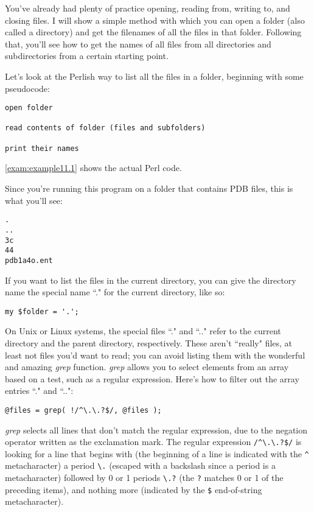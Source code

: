 You've already had plenty of practice opening, reading from, writing to, and closing files. I will show a simple method with which you can open a folder (also called a directory) and get the filenames of all the files in that folder. Following that, you'll see how to get the names of all files from all directories and subdirectories from a certain starting point.

Let's look at the Perlish way to list all the files in a folder, beginning with some pseudocode: 

\begin{lstlisting}
open folder

read contents of folder (files and subfolders)

print their names
\end{lstlisting}

\autoref{exam:example11.1} shows the actual Perl code.



Since you're running this program on a folder that contains PDB files, this is what you'll see: 

\begin{lstlisting}
.
..
3c
44
pdb1a4o.ent
\end{lstlisting}

If you want to list the files in the current directory, you can give the directory name the special name ``." for the current directory, like so:

\begin{lstlisting}
my $folder = '.';
\end{lstlisting}

On Unix or Linux systems, the special files ``." and ``.." refer to the current directory and the parent directory, respectively. These aren't ``really" files, at least not files you'd want to read; you can avoid listing them with the wonderful and amazing \textit{grep} function.  \textit{grep} allows you to select elements from an array based on a test, such as a regular expression. Here's how to filter out the array entries ``." and ``..": 

\begin{lstlisting}
@files = grep( !/^\.\.?$/, @files );
\end{lstlisting}

\textit{grep} selects all lines that don't match the regular expression, due to the negation operator written as the exclamation mark. The regular expression \verb|/^\.\.?$/| is looking for a line that begins with (the beginning of a line is indicated with the \verb|^| metacharacter) a period \verb|\.| (escaped with a backslash since a period is a metacharacter) followed by 0 or 1 periods \verb|\.?| (the \verb|?| matches 0 or 1 of the preceding items), and nothing more (indicated by the \verb|$| end-of-string metacharacter).

